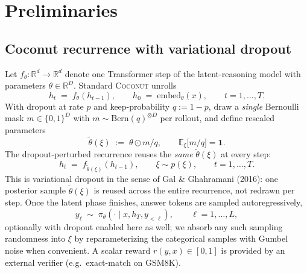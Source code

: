 \documentclass[11pt]{article}
\theoremstyle{definition}
\theoremstyle{remark}
\newcommand{\R}{\mathbb{R}}
\newcommand{\E}{\mathbb{E}}
\begin{document}
\section{Preliminaries}

\subsection{Coconut recurrence with variational dropout}
\label{sec:coconut-recurrence}

Let $f_\theta : \R^d \to \R^d$ denote one Transformer step of the
latent-reasoning model with parameters $\theta \in \R^D$.  Standard
\textsc{Coconut} unrolls
\begin{equation}
h_t \;=\; f_\theta(h_{t-1}),
\qquad
h_0 \;=\; \mathrm{embed}_\theta(x),
\qquad t = 1,\dots,T.
\end{equation}
With dropout at rate $p$ and keep-probability $q := 1-p$, draw a
\emph{single} Bernoulli mask $m \in \{0,1\}^D$ with
$m \sim \mathrm{Bern}(q)^{\otimes D}$ per rollout, and define rescaled
parameters
\begin{equation}
\tilde\theta(\xi) \;:=\; \theta \odot m / q,
\qquad
\E_\xi\!\big[m/q\big] = \mathbf 1.
\label{eq:dropout-rescale}
\end{equation}
The dropout-perturbed recurrence reuses the \emph{same} $\tilde\theta(\xi)$
at every step:
\begin{equation}
h_t \;=\; f_{\tilde\theta(\xi)}(h_{t-1}),
\qquad
\xi \sim p(\xi),
\qquad t = 1,\dots,T.
\label{eq:dropout-recurrence}
\end{equation}
This is variational dropout in the sense of Gal \& Ghahramani (2016): one
posterior sample $\tilde\theta(\xi)$ is reused across the entire recurrence,
not redrawn per step.  Once the latent phase finishes, answer tokens are
sampled autoregressively,
\begin{equation}
y_\ell \;\sim\; \pi_\theta(\cdot \mid x, h_T, y_{<\ell}),
\qquad \ell = 1, \dots, L,
\end{equation}
optionally with dropout enabled here as well; we absorb any such sampling
randomness into $\xi$ by reparameterizing the categorical samples with
Gumbel noise when convenient.  A scalar reward $r(y, x) \in [0,1]$ is provided
by an external verifier (e.g.\ exact-match on \textsc{GSM8K}).
\end{document}
